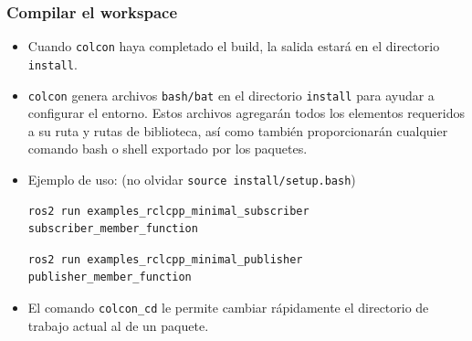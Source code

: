 \begin{frame}[fragile]
	\frametitle{Compilar el workspace}
	\begin{itemize}

	   \item Cuando \lstinline[style=bash]{colcon} haya completado el build, la salida estará en el directorio  \lstinline[style=bash]{install}.
       \item \lstinline[style=bash]{colcon} genera archivos \lstinline[style=bash]{bash/bat} en el directorio \lstinline[style=bash]{install} para ayudar a configurar el entorno. Estos archivos agregarán todos los elementos requeridos a su ruta y rutas de biblioteca, así como también proporcionarán cualquier comando bash o shell exportado por los paquetes.

        \item Ejemplo de uso: (no olvidar \lstinline[style=bash]{source install/setup.bash})
\begin{lstlisting}[style=bash] 
ros2 run examples_rclcpp_minimal_subscriber subscriber_member_function
\end{lstlisting}

\begin{lstlisting}[style=bash] 
ros2 run examples_rclcpp_minimal_publisher publisher_member_function
\end{lstlisting}
\item El comando \lstinline[style=bash]{colcon_cd} le permite cambiar rápidamente el directorio de trabajo actual al de un paquete.
    \end{itemize}

\end{frame}

